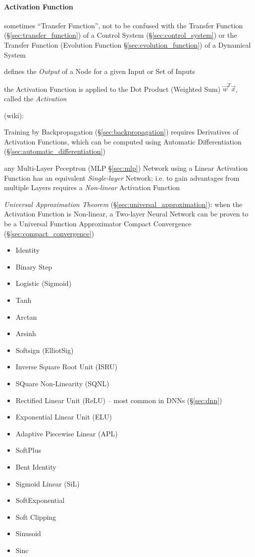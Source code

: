 \paragraph{Activation Function}\label{sec:activation_function}\hfill

sometimes ``Transfer Function'', not to be confused with the Transfer Function
(\S\ref{sec:transfer_function}) of a Control System (\S\ref{sec:control_system})
or the Transfer Function (Evolution Function \S\ref{sec:evolution_function}) of
a Dynamical System

defines the \emph{Output} of a Node for a given Input or Set of Inputs

the Activation Function is applied to the Dot Product (Weighted Sum)
$\vec{w}^T \vec{x}$, called the \emph{Activation}

(wiki):

Training by Backpropagation (\S\ref{sec:backpropagation}) requires Derivatives
of Activation Functions, which can be computed using Automatic Differentiation
(\S\ref{sec:automatic_differentiation})

any Multi-Layer Peceptron (MLP \S\ref{sec:mlp}) Network using a Linear
Activation Function has an equivalent \emph{Single-layer} Network; i.e. to gain
advantages from multiple Layers requires a \emph{Non-linear} Activation Function

\emph{Universal Approximation Theorem} (\S\ref{sec:universal_approximation}):
when the Activation Function is Non-linear, a Two-layer Neural Network can be
proven to be a Universal Function Approximator \fist Compact Convergence
(\S\ref{sec:compact_convergence})

\begin{itemize}
  \item Identity
  \item Binary Step
  \item Logistic (Sigmoid)
  \item Tanh
  \item Arctan
  \item Arsinh
  \item Softsign (ElliotSig)
  \item Inverse Square Root Unit (ISRU)
  \item SQuare Non-Linearity (SQNL)
  \item Rectified Linear Unit (ReLU) -- most common in DNNs (\S\ref{sec:dnn})
  \item Exponential Linear Unit (ELU)
  \item Adaptive Piecewise Linear (APL)
  \item SoftPlus
  \item Bent Identity
  \item Sigmoid Linear (SiL)
  \item SoftExponential
  \item Soft Clipping
  \item Sinusoid
  \item Sinc
\end{itemize}

